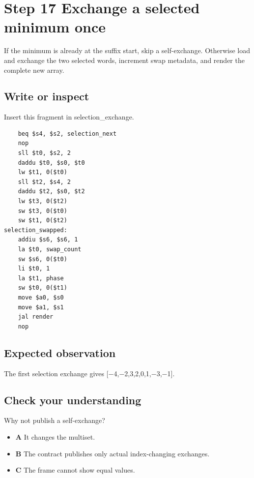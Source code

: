 \section{Step 17 Exchange a selected minimum
  once}\label{009-sorting-visualizer-s17-step-17-exchange-a-selected-minimum-once}

If the minimum is already at the suffix start, skip a self-exchange.
Otherwise load and exchange the two selected words, increment swap
metadata, and render the complete new array.

\subsection{Write or
  inspect}\label{009-sorting-visualizer-s17-write-or-inspect}

Insert this fragment in selection\_exchange.

\begin{verbatim}
    beq $s4, $s2, selection_next
    nop
    sll $t0, $s2, 2
    daddu $t0, $s0, $t0
    lw $t1, 0($t0)
    sll $t2, $s4, 2
    daddu $t2, $s0, $t2
    lw $t3, 0($t2)
    sw $t3, 0($t0)
    sw $t1, 0($t2)
selection_swapped:
    addiu $s6, $s6, 1
    la $t0, swap_count
    sw $s6, 0($t0)
    li $t0, 1
    la $t1, phase
    sw $t0, 0($t1)
    move $a0, $s0
    move $a1, $s1
    jal render
    nop
\end{verbatim}

\subsection{Expected
  observation}\label{009-sorting-visualizer-s17-expected-observation}

The first selection exchange gives {[}\ensuremath{-}4,\ensuremath{-}2,3,2,0,1,\ensuremath{-}3,\ensuremath{-}1{]}.

\subsection{Check your
  understanding}\label{009-sorting-visualizer-s17-check-your-understanding}

Why not publish a self-exchange?

\begin{itemize}
  \tightlist
  \item
        \textbf{A} It changes the multiset.
  \item
        \textbf{B} The contract publishes only actual index-changing
        exchanges.
  \item
        \textbf{C} The frame cannot show equal values.
\end{itemize}
